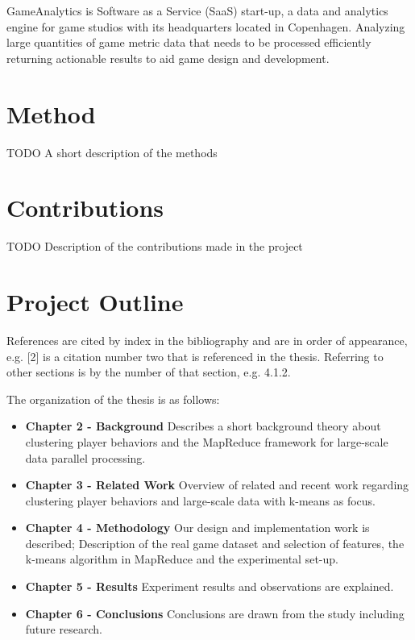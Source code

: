 GameAnalytics is Software as a Service (SaaS) start-up, a data and analytics engine for game studios with its headquarters located in Copenhagen. Analyzing large quantities of game metric data that needs to be processed efficiently returning actionable results to aid game design and development. 

\section{Method}
TODO
A short description of the methods

\lipsum[2]

\section{Contributions}
TODO
Description of the contributions made in the project

\lipsum[3]


\section{Project Outline}
References are cited by index in the bibliography and are in order of appearance, e.g. [2] is a citation number two that is referenced in the thesis. Referring to other sections is by the number of that section, e.g. 4.1.2.

The organization of the thesis is as follows: 
\begin{itemize}
\item \textbf{Chapter 2 - Background} Describes a short background theory about clustering player behaviors and the MapReduce framework for large-scale data parallel processing.
\item \textbf{Chapter 3 - Related Work} Overview of related and recent work regarding clustering player behaviors and large-scale data with k-means as focus.
\item \textbf{Chapter 4 - Methodology} Our design and implementation work is described; Description of the real game dataset and selection of features, the k-means algorithm in MapReduce and the experimental set-up.
\item \textbf{Chapter 5 - Results} Experiment results and observations are explained.
\item \textbf{Chapter 6 - Conclusions} Conclusions are drawn from the study including future research.
\end{itemize}
